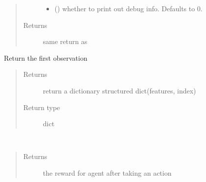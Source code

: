 \documentclass[letterpaper,10pt,english]{sphinxmanual}
\begin{document}
\begin{fulllineitems}
\begin{fulllineitems}
\begin{quote}
\begin{description}
\begin{itemize}
\item {} 
\sphinxAtStartPar
{} (\sphinxstyleliteralemphasis{\sphinxupquote{, }}) \textendash{} whether to print out debug info. Defaults to 0.

\end{itemize}

\item[{Returns}] \leavevmode
\sphinxAtStartPar
same return as {\hyperref[\detokenize{CryptoEnv:crypto_env.core.CryptoEnv.step}]{}}

\end{description}\end{quote}

\end{fulllineitems}


\begin{fulllineitems}
\label{\detokenize{CryptoEnv:crypto_env.core.CryptoEnv.first_observation}}
\sphinxAtStartPar
Return the first observation
\begin{quote}\begin{description}
\item[{Returns}] \leavevmode
\sphinxAtStartPar
return a dictionary structured dict(features, index)

\item[{Return type}] \leavevmode
\sphinxAtStartPar
dict

\end{description}\end{quote}

\end{fulllineitems}


\begin{fulllineitems}
\label{\detokenize{CryptoEnv:crypto_env.core.CryptoEnv.get_reward}}~\begin{quote}\begin{description}
\item[{Returns}] \leavevmode
\sphinxAtStartPar
the reward for agent after taking an action


\end{description}
\end{quote}
\end{fulllineitems}
\end{fulllineitems}
\end{document}

